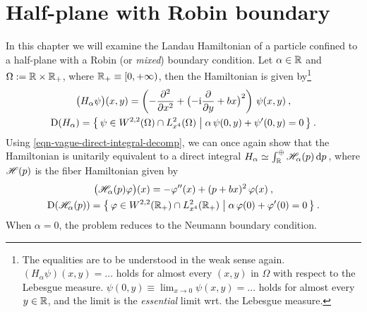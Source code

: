 \chapter{Half-plane with Robin boundary} \label{chapter-robin}
In this chapter we will examine the Landau Hamiltonian of a particle confined to a half-plane with a Robin (or \textit{mixed}) boundary condition. Let $\alpha \in \mathbb{R}$ and $\Omega := \mathbb{R} \times \mathbb{R}_+$, where $\mathbb{R}_+ \equiv [0, +\infty)$, then the Hamiltonian is given by\footnote{
    The equalities are to be understood in the weak sense again. $(H_\alpha \psi)(x, y) = ...$ holds for almost every $(x,y)$ in $\Omega$ with respect to the Lebesgue measure. $\psi(0,y) \equiv \lim_{x \to 0} \psi(x,y) = ...$ holds for almost every $y\in\mathbb{R}$, and the limit is the \textit{essential} limit wrt. the Lebesgue measure.
}
\begin{equation}
    \begin{gathered}
        \big( H_\alpha \psi \big)(x,y)
        = \left(
            -\frac{\partial ^2}{\partial x^2} +
            \big( {-\mathrm{i}} \frac{\partial }{\partial y} + bx \big)^2
        \right) \, \psi(x,y) \: ,
        \\
        \mathrm{D}(H_\alpha)
        = \big\{ \,
            \psi \in W^{2,2}(\Omega) \cap L^2_{x^4}(\Omega)
            \; \big| \;
            \alpha \, \psi(0,y) + \psi'(0,y) = 0
        \, \big\} \: .
    \end{gathered}
\end{equation}
Using \eqref{eqn-vague-direct-integral-decomp}, we can once again show that the Hamiltonian is unitarily equivalent to a direct integral $H_\alpha \simeq \int^\oplus_{\mathbb{R}} \mathscr{H}_\alpha(p) \, \mathrm{d}p \,$, where $\mathscr{H}(p)$ is the fiber Hamiltonian given by
\begin{equation}
    \begin{gathered}
        \big( \mathscr{H}_\alpha(p) \varphi \big)(x)
        = -\varphi''(x) + (p + bx)^2 \, \varphi(x) \: ,
        \\
        \mathrm{D}( \mathscr{H}_\alpha(p) )
        = \big\{ \,
            \varphi \in W^{2,2}(\mathbb{R}_+) \cap L^2_{x^4}(\mathbb{R}_+)
            \; \big| \;
            \alpha \, \varphi(0) + \varphi'(0) = 0
        \, \big\} \: .
    \end{gathered}
\end{equation}
When $\alpha=0$, the problem reduces to the Neumann boundary condition.


